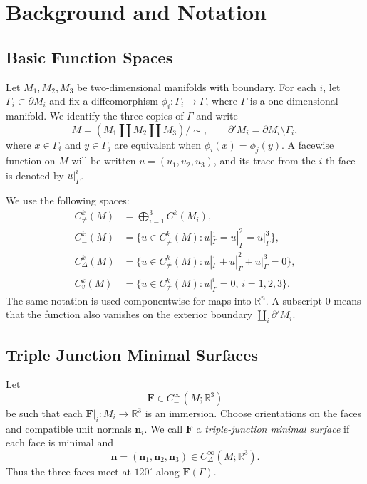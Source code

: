 \documentclass[11pt,twoside]{amsart}
\numberwithin{equation}{section}
\begin{document}
\section{Background and Notation} \label{sec: 2}

\subsection{Basic Function Spaces} \label{subsec: basic func. spaces}
Let $M_1,M_2,M_3$ be two-dimensional manifolds with boundary. For each $i$, let $\Gamma_i\subset\partial M_i$ and fix a diffeomorphism $\phi_i:\Gamma_i\to\Gamma$, where $\Gamma$ is a one-dimensional manifold. We identify the three copies of $\Gamma$ and write
\[
M=\left(M_1\coprod M_2\coprod M_3\right)/\!\sim,
\qquad
\partial' M_i=\partial M_i\setminus\Gamma_i,
\]
where $x\in\Gamma_i$ and $y\in\Gamma_j$ are equivalent when $\phi_i(x)=\phi_j(y)$. A facewise function on $M$ will be written $u=(u_1,u_2,u_3)$, and its trace from the $i$-th face is denoted by $u|_\Gamma^i$.

We use the following spaces:
\[
\begin{aligned}
C_{\neq}^k(M)&=\bigoplus_{i=1}^3 C^k(M_i),\\
C_=^k(M)&=\{u\in C_{\neq}^k(M):u|_\Gamma^1=u|_\Gamma^2=u|_\Gamma^3\},\\
C_\Delta^k(M)&=\{u\in C_{\neq}^k(M):u|_\Gamma^1+u|_\Gamma^2+u|_\Gamma^3=0\},\\
C_v^k(M)&=\{u\in C_{\neq}^k(M):u|_\Gamma^i=0,\,i=1,2,3\}.
\end{aligned}
\]
The same notation is used componentwise for maps into $\mathbb R^n$. A subscript $0$ means that the function also vanishes on the exterior boundary $\coprod_i\partial' M_i$.

\subsection{Triple Junction Minimal Surfaces} \label{subsec: triple junction surface}
Let
\[
\mathbf F\in C_=^\infty(M;\mathbb R^3)
\]
be such that each $\mathbf F|_i:M_i\to\mathbb R^3$ is an immersion. Choose orientations on the faces and compatible unit normals $\mathbf n_i$. We call $\mathbf F$ a \emph{triple-junction minimal surface} if each face is minimal and
\[
\mathbf n=(\mathbf n_1,\mathbf n_2,\mathbf n_3)\in C_\Delta^\infty(M;\mathbb R^3).
\]
Thus the three faces meet at $120^\circ$ along $\mathbf F(\Gamma)$.
\end{document}
